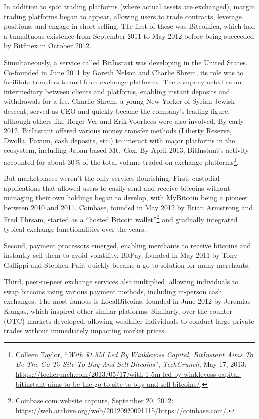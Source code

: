 \documentclass[
  a5paper,
  smalldemyvopaper,10pt,twoside,onecolumn,openright,extrafontsizes,hidelinks]{memoir}
\begin{document}
In addition to spot trading platforms (where actual assets are
exchanged), margin trading platforms began to appear, allowing users to
trade contracts, leverage positions, and engage in short selling. The
first of these was Bitcoinica, which had a tumultuous existence from
September 2011 to May 2012 before being succeeded by Bitfinex in October
2012.

Simultaneously, a service called BitInstant was developing in the United
States. Co-founded in June 2011 by Gareth Nelson and Charlie Shrem, its
role was to facilitate transfers to and from exchange platforms. The
company acted as an intermediary between clients and platforms, enabling
instant deposits and withdrawals for a fee. Charlie Shrem, a young New
Yorker of Syrian Jewish descent, served as CEO and quickly became the
company's leading figure, although others like Roger Ver and Erik
Voorhees were also involved. By early 2012, BitInstant offered various
money transfer methods (Liberty Reserve, Dwolla, Paxum, cash deposits,
etc.) to interact with major platforms in the ecosystem, including
Japan-based Mt.~Gox. By April 2013, BitInstant's activity accounted for
about 30\% of the total volume traded on exchange platforms\footnote{Colleen
  Taylor, ``\emph{With \$1.5M Led By Winklevoss Capital, BitInstant Aims
  To Be The Go-To Site To Buy And Sell Bitcoins}'', \emph{TechCrunch},
  May 17, 2013:
  \url{https://techcrunch.com/2013/05/17/with-1-5m-led-by-winklevoss-capital-bitinstant-aims-to-be-the-go-to-site-to-buy-and-sell-bitcoins/}.}.

But marketplaces weren't the only services flourishing. First, custodial
applications that allowed users to easily send and receive bitcoins
without managing their own holdings began to develop, with MyBitcoin
being a pioneer between 2010 and 2011. Coinbase, founded in May 2012 by
Brian Armstrong and Fred Ehrsam, started as a ``hosted Bitcoin
wallet''\footnote{Coinbase.com website capture, September 20, 2012:
  \url{https://web.archive.org/web/20120920091115/https://coinbase.com/}.}
and gradually integrated typical exchange functionalities over the
years.

Second, payment processors emerged, enabling merchants to receive
bitcoins and instantly sell them to avoid volatility. BitPay, founded in
May 2011 by Tony Gallippi and Stephen Pair, quickly became a go-to
solution for many merchants.

Third, peer-to-peer exchange services also multiplied, allowing
individuals to swap bitcoins using various payment methods, including
in-person cash exchanges. The most famous is LocalBitcoins, founded in
June 2012 by Jeremias Kangas, which inspired other similar platforms.
Similarly, over-the-counter (OTC) markets developed, allowing wealthier
individuals to conduct large private trades without immediately
impacting market prices.
\end{document}

